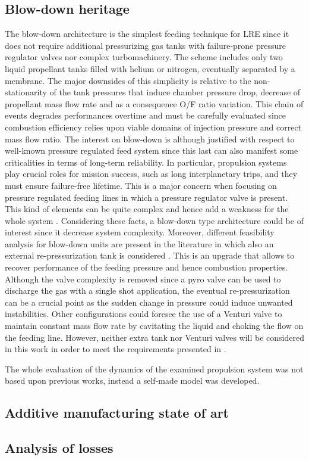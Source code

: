 \subsection{Blow-down heritage}
\label{subsec:blowdown_intro}
The blow-down architecture is the simplest feeding technique for LRE since it does not require additional pressurizing gas tanks with failure-prone pressure regulator valves nor complex turbomachinery. The scheme includes only two liquid propellant tanks filled with helium or nitrogen, eventually separated by a membrane.
The major downsides of this simplicity is relative to the non-stationarity of the tank pressures that induce chamber pressure drop, decrease of propellant mass flow rate  and as a consequence O/F ratio variation. This chain of events degrades performances overtime and must be carefully evaluated since combustion efficiency relies upon viable domains of injection pressure and correct mass flow ratio.
The interest on blow-down is although justified with respect to well-known pressure regulated feed system since this last can also manifest some criticalities in terms of long-term reliability. In particular, propulsion systems play crucial roles for mission success, such as long interplanetary trips, and they must ensure failure-free lifetime.
This is a major concern when focusing on pressure regulated feeding lines in which a pressure regulator valve is present. This kind of elements can be quite complex and hence add a weakness for the whole system \cite{valve_criticalities}.
Considering these facts, a blow-down type architecture could be of interest since it decrease system complexity. Moreover, different feasibility analysis for blow-down units are present in the literature in which also an external re-pressurization tank is considered \cite{repressurization}.
This is an upgrade that allows to recover performance of the feeding pressure and hence combustion properties. Although the valve complexity is removed since a pyro valve can be used to discharge the gas with a single shot application, the eventual re-pressurization can be a crucial point as the sudden change in pressure could induce unwanted instabilities.
Other configurations could foresee the use of a Venturi valve to maintain constant mass flow rate by cavitating the liquid and choking the flow on the feeding line. However, neither extra tank nor Venturi valves will be considered in this work in order to meet the requirements presented in \mref.

The whole evaluation of the dynamics of the examined propulsion system was not based upon previous works, instead a self-made model was developed.
\subsection{Additive manufacturing state of art}
\label{subsec:additive_intro}

\subsection{Analysis of losses}
\label{subsec:losses_intro}